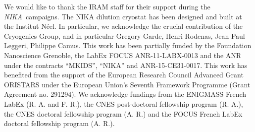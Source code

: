 \documentclass[twocolumn,traditabstract]{aa}
\def\NIKA{\textit{NIKA}}
\begin{document}


\vspace{0.2cm}
 \begin{acknowledgements}
We would like to thank the IRAM staff for their support during the \NIKA\ campaigns. 
The NIKA dilution cryostat has been designed and built at the Institut N\'eel. 
In particular, we acknowledge the crucial contribution of the Cryogenics Group, and 
in particular Gregory Garde, Henri Rodenas, Jean Paul Leggeri, Philippe Camus. 
This work has been partially funded by the Foundation Nanoscience Grenoble, the LabEx FOCUS ANR-11-LABX-0013 and 
the ANR under the contracts ``MKIDS'', ``NIKA'' and ANR-15-CE31-0017. 
This work has benefited from the support of the European Research Council Advanced Grant ORISTARS 
under the European Union's Seventh Framework Programme (Grant Agreement no. 291294).
We acknowledge fundings from the ENIGMASS French LabEx (R. A. and F. R.), 
the CNES post-doctoral fellowship program (R. A.),  the CNES doctoral fellowship program (A. R.) and 
the FOCUS French LabEx doctoral fellowship program (A. R.).
\end{acknowledgements}
\end{document}
